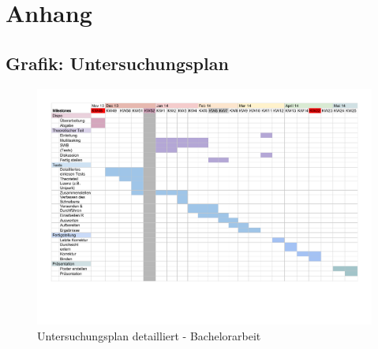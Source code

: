 %
%


\appendix
\chapter{Anhang}\label{chap.anhang}

\section{Grafik: Untersuchungsplan}\label{sec.anhangPlan}
\begin{figure}[H]
	\centering
	    \noindent\includegraphics[width=\linewidth,height=\textheight,keepaspectratio,angle={90}]
		{images/Untersuchungsplan.pdf}
	\caption{Untersuchungsplan detailliert - Bachelorarbeit}
	\label{fig.Untersuchungsplan}
\end{figure}
